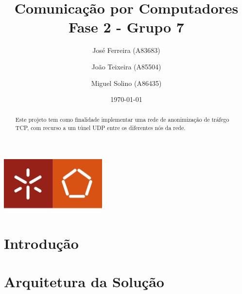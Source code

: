 \documentclass[a4paper]{report}
\begin{document}
\title{Comunicação por Computadores\\ 
\large Fase 2 - Grupo 7}
\author{José Ferreira (A83683) \and João Teixeira (A85504) \and Miguel Solino (A86435)}
\date{\today}

\begin{center}
    \begin{minipage}{0.75\linewidth}
        \centering
        \includegraphics[width=0.4\textwidth]{images/eng.jpeg}\par\vspace{1cm}
        \vspace{1.5cm}
        \href{https://www.uminho.pt/PT}
        {\color{black}{\scshape\LARGE Universidade do Minho}} \par
        \vspace{1cm}
        \href{https://www.di.uminho.pt/}
        {\color{black}{\scshape\Large Departamento de Informática}} \par
        \vspace{1.5cm}
        \maketitle
    \end{minipage}
\end{center}

\pagebreak

\begin{abstract}
    \begin{center}
        Este projeto tem como finalidade implementar uma rede de anonimização de
        tráfego TCP, com recurso a um túnel UDP entre os diferentes nós da rede.
    \end{center}
\end{abstract}

\tableofcontents

\chapter{Introdução}

\chapter{Arquitetura da Solução}
\end{document}
